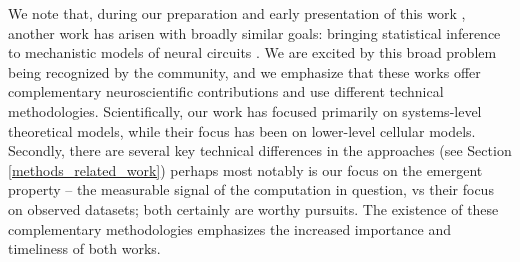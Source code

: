 \documentclass[11pt]{article}
\begin{document}


We note that, during our preparation and early presentation of this work \cite{bittner2019degenerate, bittner2019examining}, another work has arisen with broadly similar goals: bringing statistical inference to mechanistic models of neural circuits \cite{lueckmann2019amortised}.  
We are excited by this broad problem being recognized by the community, and we emphasize that these works offer complementary neuroscientific contributions and use different technical methodologies.  
Scientifically, our work has focused primarily on systems-level theoretical models, while their focus has been on lower-level cellular models.
Secondly, there are several key technical differences in the approaches (see Section \ref{methods_related_work}) perhaps most notably is our focus on the emergent property -- the measurable signal of the computation in question, vs their focus on observed datasets; both certainly are worthy pursuits.
The existence of these complementary methodologies emphasizes the increased importance and timeliness of both works. 
\end{document}
